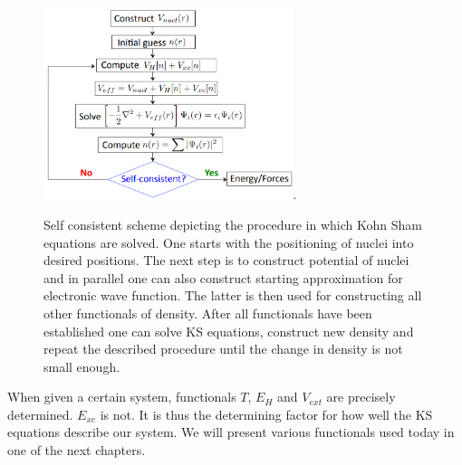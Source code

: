 \documentclass[openany, longbibliography,slovene,a4paper,12pt]{article}
\begin{document}
\begin{figure}
  \centering
  \includegraphics[width=0.65\textwidth]{self_consistent_scheme.png}.
  \caption{Self consistent scheme depicting the procedure in which Kohn Sham
    equations are solved. One starts with the positioning of nuclei into
    desired positions. The next step is to construct potential of nuclei and in
    parallel one can also construct starting approximation for electronic wave
    function. The latter is then used for constructing all other functionals of
    density. After all functionals have been established one can solve KS
    equations, construct new density and repeat the described procedure until
    the change in density is not small enough.
  }
  \label{self_consistent_scheme}
\end{figure}

When given a certain system, functionals $T$, $E_H$ and $V_{ext}$ are precisely
determined. $E_{xc}$ is not. It is thus the determining factor for how well the KS
equations describe our system. We will present various functionals used today in
one of the next chapters.
\end{document}
